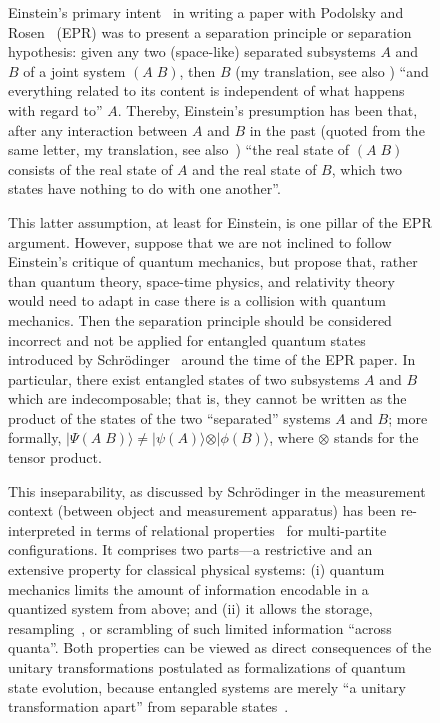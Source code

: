\documentclass[entropy,article,accept,oneauthor,pdftex]{Definitions/mdpi}
\begin{document}
\begin{figure}[H]
Einstein's primary intent~\cite{einstei-letter-to-schr,Meyenn-2011,Howard1985171} in writing a paper
with Podolsky and Rosen~\cite{epr} (EPR) was to present a separation principle or separation hypothesis:
given any two (space-like) separated subsystems $A$ and $B$ of a joint system $(A\;B)$, then
$B$ (my translation, see also \cite{Howard1985171})
``and everything related to its content is independent of what happens with regard to'' $A$. %
Thereby,
Einstein's presumption has been that, after any interaction between $A$ and $B$ in the past
(quoted from the same letter, my translation, see also~\cite{Howard1985171})
``the real state of $(A\;B)$ consists of the real state of $A$ and the real state of $B$,
which two states have nothing to do with one another''.

This latter assumption, at least for Einstein, is one pillar of the EPR argument.
However, suppose that we are not inclined to follow Einstein's critique of quantum mechanics, but
propose that, rather than quantum theory, space-time physics, and relativity theory
would need to adapt in case there is a collision with quantum mechanics.
Then the separation principle should be considered
incorrect and not be applied for entangled quantum states introduced by
Schr\"odinger~\cite{schrodinger-1,schrodinger-2,CambridgeJournals:2027212,CambridgeJournals:1737068}
around the time of the EPR paper.
In particular, there exist entangled states of two subsystems $A$ and $B$ which are indecomposable; that is,
they cannot be written as the product of the states of the two ``separated'' systems
$A$ and $B$; more formally,
$\vert \Psi(A\; B) \rangle \neq \vert \psi (A) \rangle \otimes \vert \phi (B) \rangle$,
where $\otimes$ stands for the tensor product.

This inseparability, as discussed by Schr\"odinger in the measurement context (between object and measurement apparatus)
has been re-interpreted in terms of relational properties~\cite{zeil-99} for multi-partite configurations.
It comprises two parts---a restrictive and an extensive property for classical physical systems:
(i) quantum mechanics limits the amount of information encodable in a quantized system from above; and
(ii) it allows the storage, resampling~\cite{svozil-2016-sampling}, or scrambling of such limited information ``across quanta''.
Both properties can be viewed as direct consequences of the unitary transformations postulated as
formalizations of quantum state evolution, because entangled systems are merely
``a unitary transformation apart'' from separable states~\cite[Section~12.8.2]{svozil-pac}.


\end{figure}
\end{document}
